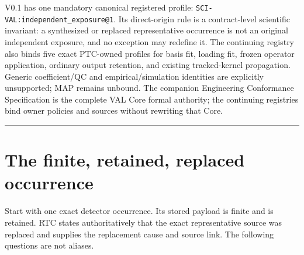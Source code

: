 \documentclass[10pt]{article}
\begin{document}
\begin{titlepage}
V0.1 has one mandatory canonical registered profile:
\texttt{SCI-VAL:independent\_exposure@1}. Its direct-origin rule is a
contract-level scientific invariant: a synthesized or replaced representative
occurrence is not an original independent exposure, and no exception may
redefine it. The continuing registry also binds five exact PTC-owned profiles
for basis fit, loading fit, frozen operator application, ordinary output
retention, and existing tracked-kernel propagation. Generic coefficient/QC
and empirical/simulation identities are explicitly unsupported; MAP remains
unbound. The companion Engineering Conformance Specification is the complete
VAL Core formal authority; the continuing registries bind owner policies and
sources without rewriting that Core.

\vfill
{\color{VALblue}\rule{\linewidth}{2pt}}
\end{titlepage}

\section{The finite, retained, replaced occurrence}
\label{sec:rat-worked}

Start with one exact detector occurrence. Its stored payload is finite and is
retained. RTC states authoritatively that the exact representative source was
replaced and supplies the replacement cause and source link. The following
questions are not aliases.
\end{document}
